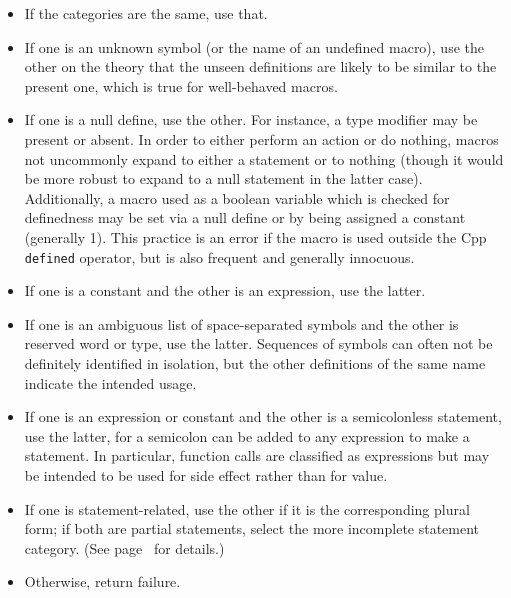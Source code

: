 \documentclass[10pt]{article}
\begin{document}
\begin{itemize}\itemsep 0pt \parskip 0pt

\item If the categories are the same, use that.

\item If one is an unknown symbol (or the name of an undefined macro), use
  the other on the theory that the unseen definitions are likely to be
  similar to the present one, which is true for well-behaved macros.

\item If one is a null define, use the other.  For instance, a type
  modifier may be present or absent.  In order to either perform an action
  or do nothing, macros not uncommonly expand to either a statement or to
  nothing (though it would be more robust to expand to a null statement in
  the latter case).  Additionally, a macro used as a boolean variable which
  is checked for definedness may be set via a null define or by being
  assigned a constant (generally 1).  This practice is an error if the
  macro is used outside the Cpp {\tt defined} operator, but is also frequent
  and generally innocuous.

\item If one is a constant and the other is an expression, use the latter.

\item If one is an ambiguous list of space-separated symbols and the other
  is reserved word or type, use the latter.  Sequences of symbols can often
  not be definitely identified in isolation, but the other definitions of
  the same name indicate the intended usage.

\item If one is an expression or constant and the other is a semicolonless
  statement, use the latter, for a semicolon can be added to any expression
  to make a statement.  In particular, function calls are classified as
  expressions but may be intended to be used for side effect rather than
  for value.

\item If one is statement-related, use the other if it is the corresponding
  plural form; if both are partial statements, select the more incomplete
  statement category.  (See page~\pageref{item:statement-category} for
  details.)

\item Otherwise, return failure.
\end{itemize}
\end{document}
